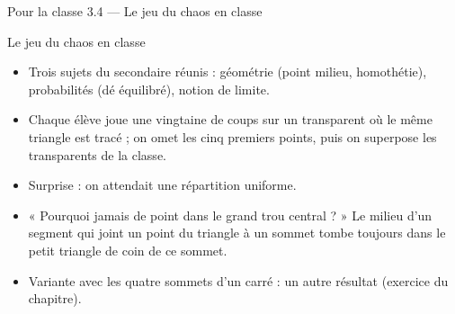 \begin{frame}{Pour la classe 3.4 --- Le jeu du chaos en classe}
  \begin{Classe}{Le jeu du chaos en classe}
    \small
    \begin{itemize}
      \item Trois sujets du secondaire réunis : géométrie (point milieu,
        homothétie), probabilités (dé équilibré), notion de limite.
      \item Chaque élève joue une vingtaine de coups sur un transparent
        où le même triangle est tracé ; on omet les cinq premiers points,
        puis on superpose les transparents de la classe.
      \item Surprise : on attendait une répartition uniforme.
      \item « Pourquoi jamais de point dans le grand trou central ? » Le
        milieu d'un segment qui joint un point du triangle à un sommet
        tombe toujours dans le petit triangle de coin de ce sommet.
      \item Variante avec les quatre sommets d'un carré : un autre
        résultat (exercice du chapitre).
    \end{itemize}
  \end{Classe}
\end{frame}
